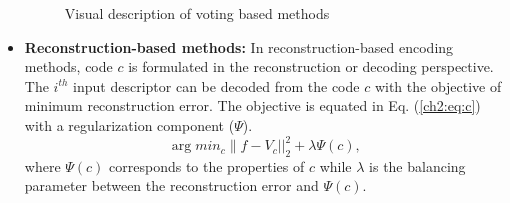 \begin{itemize}
\begin{figure}[h!]
\centering
{}
 \caption[Visual description of voting based methods]{\fontsize{10pt}{12pt}\selectfont Visual description of voting based methods \cite{peng2016}}
    \label{ch2:fig:votingbasedmethods}
\end{figure}

\item \textbf{Reconstruction-based methods:} 
In reconstruction-based encoding methods, code $c$ is formulated in the reconstruction or decoding perspective. The  $i^{th}$ input descriptor can be decoded from the code $c$ with the objective of minimum reconstruction error. The objective is equated in Eq. (\ref{ch2:eq:c}) with a regularization component ($\Psi$).
\begin{equation}\label{ch2:eq:c}
\arg min_{c} {\parallel f - V_c ||}^2_2 + \lambda \Psi(c),
\end{equation}
where $\Psi(c)$ corresponds to the properties of $c$ while $\lambda$ is the balancing parameter between the reconstruction error and $\Psi(c)$. 


\end{itemize}
